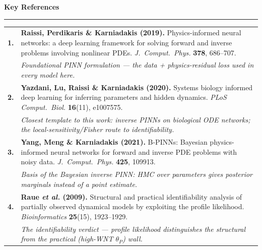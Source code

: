\documentclass[aspectratio=169,11pt]{beamer}
\newcommand{\refnum}[1]{\textcolor{SAblue}{\bfseries #1}}
\newcommand{\refwhy}[1]{{\itshape\color{SAgrey}#1}}
\begin{document}
\begin{frame}[plain]
  \vspace{0.30cm}
  \centering
  \begin{minipage}{0.965\textwidth}
    \begin{textcard}[left=16pt,right=16pt,top=10pt,bottom=10pt]
      \centering
      {\fontsize{17}{20}\selectfont\bfseries Key References\par}
      \vspace{0.10cm}
      {\color{SAblue}\rule{\linewidth}{1.5pt}}
      \vspace{0.18cm}

      \raggedright
      \fontsize{8.4}{10.4}\selectfont
      \renewcommand{\arraystretch}{1.10}
      \begin{tabular}{@{}p{0.5cm}@{}p{\dimexpr\linewidth-0.5cm\relax}@{}}
        \refnum{1.} & \textbf{Raissi, Perdikaris \& Karniadakis (2019).}
          Physics-informed neural networks: a deep learning framework for solving
          forward and inverse problems involving nonlinear PDEs.
          \emph{J.\ Comput.\ Phys.} \textbf{378}, 686--707.\\[1pt]
        & \refwhy{Foundational PINN formulation --- the data + physics-residual loss used in every model here.}\\[3.5pt]

        \refnum{2.} & \textbf{Yazdani, Lu, Raissi \& Karniadakis (2020).}
          Systems biology informed deep learning for inferring parameters and
          hidden dynamics. \emph{PLoS Comput.\ Biol.} \textbf{16}(11), e1007575.\\[1pt]
        & \refwhy{Closest template to this work: inverse PINNs on biological ODE networks; the local-sensitivity/Fisher route to identifiability.}\\[3.5pt]

        \refnum{3.} & \textbf{Yang, Meng \& Karniadakis (2021).}
          B-PINNs: Bayesian physics-informed neural networks for forward and
          inverse PDE problems with noisy data.
          \emph{J.\ Comput.\ Phys.} \textbf{425}, 109913.\\[1pt]
        & \refwhy{Basis of the Bayesian inverse PINN: HMC over parameters gives posterior marginals instead of a point estimate.}\\[3.5pt]

        \refnum{4.} & \textbf{Raue \emph{et al.} (2009).}
          Structural and practical identifiability analysis of partially observed
          dynamical models by exploiting the profile likelihood.
          \emph{Bioinformatics} \textbf{25}(15), 1923--1929.\\[1pt]
        & \refwhy{The identifiability verdict --- profile likelihood distinguishes the structural from the practical (high-WNT $\theta_P$) wall.}\\[3.5pt]


\end{tabular}
\end{textcard}
\end{minipage}
\end{frame}
\end{document}
